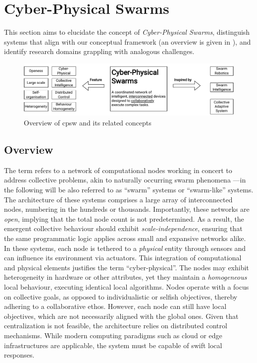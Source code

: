 \chapter{Cyber-Physical Swarms}\label{chap:cpsw}\mtcaddchapter
\minitoc%
This section aims to elucidate the concept of \textit{Cyber-Physical Swarms}, 
 distinguish systems that align with our conceptual framework (an overview is given in ), 
 and identify research domains grappling with analogous challenges. 
% 
\begin{figure}
    \includegraphics[width=\textwidth]{chapters/img/cyber-physical-swarms-overview.drawio.pdf}
    \caption{Overview of \acf{cpsw} and its related concepts}\label{fig:overview-cpsw}
\end{figure}
\section{Overview}
The term refers to a network of computational nodes working in concert to address collective problems, 
 akin to naturally occurring swarm phenomena ---in the following will be also referred to as ``swarm'' systems or ``swarm-like'' systems.
%
The architecture of these systems comprises a large array of interconnected nodes, 
 numbering in the hundreds or thousands. 
% 
Importantly, these networks are \textit{open}, 
 implying that the total node count is not predetermined. 
% 
As a result, 
 the emergent collective behaviour should exhibit \textit{scale-independence}, 
 ensuring that the same programmatic logic applies across small and expansive networks alike.
%
In these systems, each node is tethered to a \textit{physical} entity through sensors and can influence its environment via actuators. 
 This integration of computational and physical elements justifies the term ``cyber-physical''. 
 The nodes may exhibit heterogeneity in hardware or other attributes, 
 yet they maintain a \emph{homogeneous} local behaviour, executing identical local algorithms.
%
Nodes operate with a focus on collective goals, 
 as opposed to individualistic or selfish objectives, 
 thereby adhering to a collaborative ethos.
%
However, each node can still have local objectives, 
 which are not necessarily aligned with the global ones.
% 
Given that centralization is not feasible, 
 the architecture relies on distributed control mechanisms. 
 While modern computing paradigms such as cloud or edge infrastructures are applicable, 
 the system must be capable of swift local responses. 

